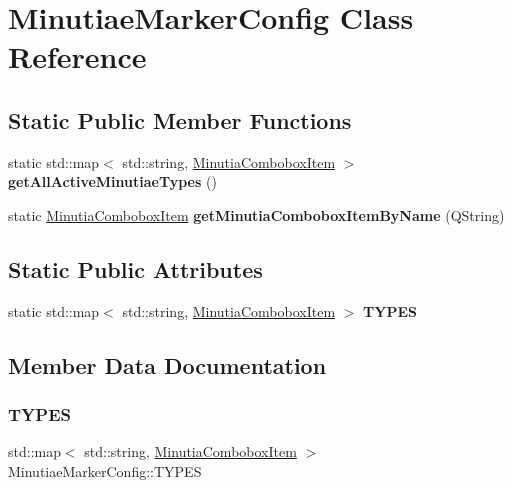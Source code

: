 \hypertarget{class_minutiae_marker_config}{}\section{Minutiae\+Marker\+Config Class Reference}
\label{class_minutiae_marker_config}
\subsection*{Static Public Member Functions}
\begin{DoxyCompactItemize}
\item 
\mbox{\label{class_minutiae_marker_config_ac6c632fb03e3beb07f2b6db188335e89}} 
static std\+::map$<$ std\+::string, \mbox{\hyperlink{class_minutia_combobox_item}{Minutia\+Combobox\+Item}} $>$ {\bfseries get\+All\+Active\+Minutiae\+Types} ()
\item 
\mbox{\label{class_minutiae_marker_config_afc78df9bbf76ea8d31cc4fe7f4c68348}} 
static \mbox{\hyperlink{class_minutia_combobox_item}{Minutia\+Combobox\+Item}} {\bfseries get\+Minutia\+Combobox\+Item\+By\+Name} (Q\+String)
\end{DoxyCompactItemize}
\subsection*{Static Public Attributes}
\begin{DoxyCompactItemize}
\item 
static std\+::map$<$ std\+::string, \mbox{\hyperlink{class_minutia_combobox_item}{Minutia\+Combobox\+Item}} $>$ {\bfseries T\+Y\+P\+ES}
\end{DoxyCompactItemize}


\subsection{Member Data Documentation}
\mbox{\label{class_minutiae_marker_config_ac62b4672dfca3706c7a51ca4bdf8b018}} 
\subsubsection{\texorpdfstring{T\+Y\+P\+ES}{TYPES}}
{\footnotesize\ttfamily std\+::map$<$ std\+::string, \mbox{\hyperlink{class_minutia_combobox_item}{Minutia\+Combobox\+Item}} $>$ Minutiae\+Marker\+Config\+::\+T\+Y\+P\+ES\hspace{0.3cm}{\ttfamily [static]}}


